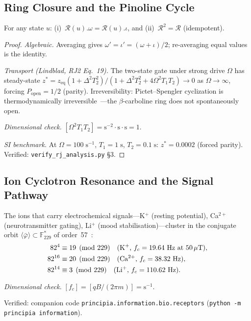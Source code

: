 \subsection{Ring Closure and the Pinoline Cycle}

\begin{theorem}
\label{thm:ring_closure}
For any state $u$: (i)~$\mathcal{R}(u).\omega = \mathcal{R}(u).\iota$, and (ii)~$\mathcal{R}^2 = \mathcal{R}$ (idempotent).

\begin{proof}
\emph{Algebraic.} Averaging gives $\omega' = \iota' = (\omega+\iota)/2$; re-averaging equal values is the identity.

\emph{Transport (Lindblad, RJ2 Eq.~19).}
The two-state gate under strong drive $\Omega$ has steady-state
$z^* = z_\mathrm{eq}(1+\Delta^2T_2^2)/(1+\Delta^2T_2^2+4\Omega^2T_1T_2) \to 0$
as $\Omega\to\infty$, forcing $P_\mathrm{open} = 1/2$ (parity).
Irreversibility: Pictet--Spengler cyclization is thermodynamically
irreversible~\cite{stockigt11}---the $\beta$-carboline ring does not
spontaneously open.

\emph{Dimensional check.}
$[\Omega^2 T_1 T_2] = \mathrm{s^{-2}\cdot s\cdot s} = 1$. \checkmark

\emph{SI benchmark.}
At $\Omega = 100\;\mathrm{s^{-1}}$, $T_1 = 1\;\mathrm{s}$, $T_2 = 0.1\;\mathrm{s}$:
$z^* = 0.0002$ (forced parity). Verified: \texttt{verify\_rj\_analysis.py} \S3.
\qedhere
\end{proof}
\end{theorem}

\subsection{Ion Cyclotron Resonance and the Signal Pathway}

\begin{result}
\label{res:ions}
The ions that carry electrochemical signals---K$^+$ (resting potential),
Ca$^{2+}$ (neurotransmitter gating), Li$^+$ (mood stabilisation)---cluster
in the conjugate orbit $\langle\bar\varphi\rangle \subset \mathbb{F}_{229}^*$
of order~57~\cite{rja}:
\begin{align}
  82^4 &\equiv 19 \pmod{229} \quad\text{(K$^+$, $f_c = 19.64$ Hz at 50\,$\mu$T)}, \\
  82^{16} &\equiv 20 \pmod{229} \quad\text{(Ca$^{2+}$, $f_c = 38.32$ Hz)}, \\
  82^{14} &\equiv 3 \pmod{229} \quad\text{(Li$^+$, $f_c = 110.62$ Hz)}.
\end{align}

\emph{Dimensional check.} $[f_c] = [qB/(2\pi m)] = \mathrm{s^{-1}}$. \checkmark

Verified: companion code \texttt{principia.information.bio.receptors} (\texttt{python -m principia information}).
\end{result}

